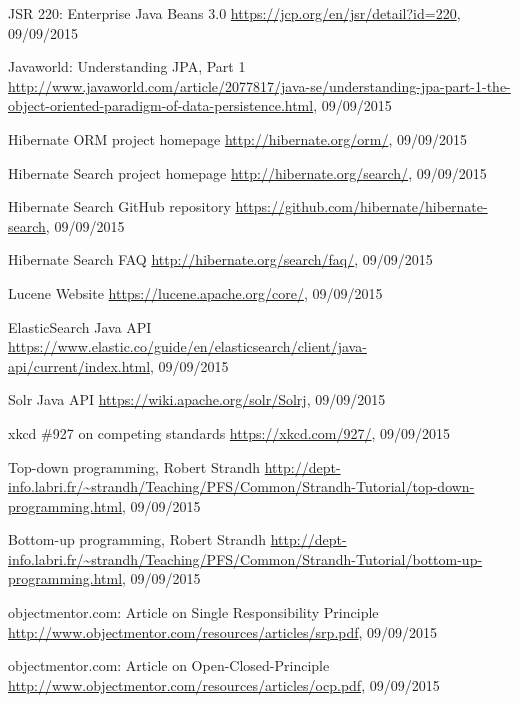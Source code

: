 %
%
\begin{thebibliography}{100}
	
	 JSR 220: Enterprise Java Beans 3.0
	\url{https://jcp.org/en/jsr/detail?id=220}, 09/09/2015
	
	 Javaworld: Understanding JPA, Part 1
	\url{http://www.javaworld.com/article/2077817/java-se/understanding-jpa-part-1-the-object-oriented-paradigm-of-data-persistence.html}, 09/09/2015
	
	 Hibernate ORM project homepage
	\url{http://hibernate.org/orm/}, 09/09/2015
	
	 Hibernate Search project homepage
	\url{http://hibernate.org/search/}, 09/09/2015
	
	 Hibernate Search GitHub repository
	\url{https://github.com/hibernate/hibernate-search}, 09/09/2015
	
	 Hibernate Search FAQ
	\url{http://hibernate.org/search/faq/}, 09/09/2015
	
	 Lucene Website
	\url{https://lucene.apache.org/core/}, 09/09/2015
	
	 ElasticSearch Java API
	\url{https://www.elastic.co/guide/en/elasticsearch/client/java-api/current/index.html}, 09/09/2015
	
	 Solr Java API
	\url{https://wiki.apache.org/solr/Solrj}, 09/09/2015
	
	 xkcd \#927 on competing standards
	\url{https://xkcd.com/927/}, 09/09/2015
	
	 Top-down programming, Robert Strandh
	\url{http://dept-info.labri.fr/~strandh/Teaching/PFS/Common/Strandh-Tutorial/top-down-programming.html},
	09/09/2015
	
	 Bottom-up programming, Robert Strandh
	\url{http://dept-info.labri.fr/~strandh/Teaching/PFS/Common/Strandh-Tutorial/bottom-up-programming.html},
	09/09/2015
	
	 objectmentor.com: Article on Single Responsibility Principle
	\url{http://www.objectmentor.com/resources/articles/srp.pdf}, 09/09/2015
	
	 objectmentor.com: Article on Open-Closed-Principle
	\url{http://www.objectmentor.com/resources/articles/ocp.pdf}, 09/09/2015
	

\end{thebibliography}
